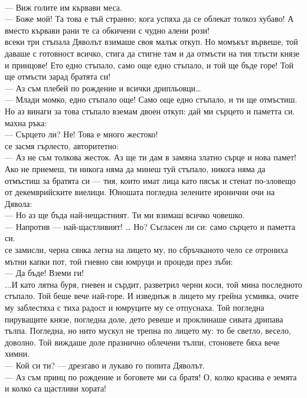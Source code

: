 \documentclass[12pt,a4paper]{article}
\begin{document}
\\
— Виж голите им кървави меса.
\\
— Боже мой! Та това е тъй странно; кога успяха да се облекат толкоз хубаво! А вместо кървави рани те са обкичени с чудно алени рози!
\\
 всеки три стъпала Дяволът взимаше своя малък откуп. Но момъкът вървеше, той даваше с готовност всичко, стига да стигне там и да отмъсти на тия тлъсти князе и принцове! Ето едно стъпало, само още едно стъпало, и той ще бъде горе! Той ще отмъсти зарад братята си!
\\
— Аз съм плебей по рождение и всички дрипльовци…
\\
— Млади момко, едно стъпало още! Само още едно стъпало, и ти ще отмъстиш. Но аз винаги за това стъпало вземам двоен откуп: дай ми сърцето и паметта си.
\\
 махна ръка:
\\
— Сърцето ли? Не! Това е много жестоко!
\\
 се засмя гърлесто, авторитетно:
\\
— Аз не съм толкова жесток. Аз ще ти дам в замяна златно сърце и нова памет! Ако не приемеш, ти никога няма да минеш туй стъпало, никога няма да отмъстиш за братята си — тия, които имат лица като пясък и стенат по-зловещо от декемврийските виелици. Юношата погледна зелените иронични очи на Дявола:
\\
— Но аз ще бъда най-нещастният. Ти ми взимаш всичко човешко.
\\
— Напротив — най-щастливият! … Но? Съгласен ли си: само сърцето и паметта си.
\\
 се замисли, черна сянка легна на лицето му, по сбръчканото чело се отрониха мътни капки пот, той гневно сви юмруци и процеди през зъби:
\\
— Да бъде! Вземи ги!
\\
\indent...И като лятна буря, гневен и сърдит, разветрил черни коси, той мина последното стъпало. Той беше вече най-горе. И изведнъж в лицето му грейна усмивка, очите му заблестяха с тиха радост и юмруците му се отпуснаха. Той погледна пируващите князе, погледна доле, дето ревеше и проклинаше сивата дрипава тълпа. Погледна, но нито мускул не трепна по лицето му: то бе светло, весело, доволно. Той виждаше доле празнично облечени тълпи, стоновете бяха вече химни.
\\
— Кой си ти? — дрезгаво и лукаво го попита Дяволът.
\\
— Аз съм принц по рождение и боговете ми са братя! О, колко красива е земята и колко са щастливи хората!
\end{document}
